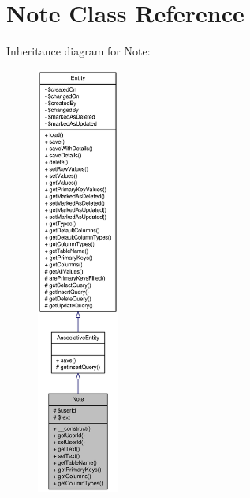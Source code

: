 \hypertarget{classNote}{
\section{Note Class Reference}
\label{classNote}
}


Inheritance diagram for Note:\nopagebreak
\begin{figure}[H]
\begin{center}
\leavevmode
\includegraphics[height=400pt]{classNote__inherit__graph}
\end{center}
\end{figure}


